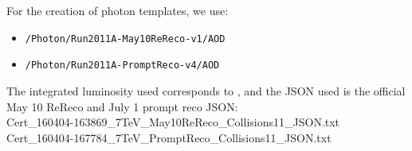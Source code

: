For the creation of photon templates, we use:

\begin{itemize}
\item \verb=/Photon/Run2011A-May10ReReco-v1/AOD=
\item \verb=/Photon/Run2011A-PromptReco-v4/AOD=
\end{itemize}

The integrated luminosity used corresponds to \lumi, and the JSON used is 
the official May 10 ReReco 
and July 1 prompt reco
JSON:
\\
Cert\_160404-163869\_7TeV\_May10ReReco\_Collisions11\_JSON.txt
\\
Cert\_160404-167784\_7TeV\_PromptReco\_Collisions11\_JSON.txt
